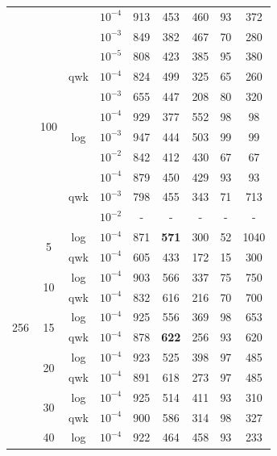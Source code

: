 \begin{table}[h!]
{{\begin{tabular}{c|c|c|c|c|c|c|c|c}
			& & & $10^{-4}$ & 913 & 453 & 460 & 93 & 372\\
			& & & $10^{-3}$ & 849 & 382 & 467 & 70 & 280\\\cline{3-9}
			& & \multirow{3}{*}{qwk} & $10^{-5}$ & 808 & 423 & 385 & 95 & 380\\
			& & & $10^{-4}$ & 824 & 499 & 325 & 65 & 260\\
			& & & $10^{-3}$ & 655 & 447 & 208 & 80 & 320\\\cline{2-9}
			& \multirow{2}{*}{100} & \multirow{3}{*}{log} & $10^{-4}$ & 929 & 377 & 552 & 98 & 98\\
			& & & $10^{-3}$ & 947 & 444 & 503 & 99 & 99\\
			& & & $10^{-2}$ & 842 & 412 & 430 & 67 & 67\\\cline{3-9}
			& & \multirow{3}{*}{qwk} & $10^{-4}$ & 879 & 450 & 429 & 93 & 93\\
			& & & $10^{-3}$ & 798 & 455 & 343 & 71 & 713\\
			& & & $10^{-2}$ & - & - & - & - & -\\
			\hline	
			\multirow{10}{*}{256} & \multirow{2}{*}{5} & \multirow{1}{*}{log} & $10^{-4}$ & 871 & \textbf{571} & 300 & 52 & 1040\\\cline{3-9}
			& & \multirow{1}{*}{qwk} & $10^{-4}$ & 605 & 433 & 172 & 15 & 300\\\cline{2-9}
			&\multirow{2}{*}{10} & \multirow{1}{*}{log} & $10^{-4}$ & 903 & 566  & 337 & 75 & 750\\\cline{3-9}
			& & \multirow{1}{*}{qwk} & $10^{-4}$ & 832 & 616 & 216 & 70 & 700\\\cline{2-9}		
			& \multirow{2}{*}{15} & \multirow{1}{*}{log} & $10^{-4}$ & 925 & 556 & 369 & 98 & 653\\\cline{3-9}
			& & \multirow{1}{*}{qwk} & $10^{-4}$ & 878 & \textbf{622} & 256 & 93 & 620\\\cline{2-9}
			& \multirow{2}{*}{20} & \multirow{1}{*}{log} & $10^{-4}$ & 923 & 525 & 398 & 97 & 485\\\cline{3-9}
			& & \multirow{1}{*}{qwk} & $10^{-4}$ & 891 & 618 & 273 & 97 & 485 \\\cline{2-9}		
			& \multirow{2}{*}{30} & \multirow{1}{*}{log} & $10^{-4}$ & 925 & 514 & 411 & 93 & 310\\\cline{3-9}
			& & \multirow{1}{*}{qwk} & $10^{-4}$ & 900 & 586 & 314 & 98 & 327\\\cline{2-9}
			& \multirow{2}{*}{40} & \multirow{1}{*}{log} & $10^{-4}$ & 922 & 464 & 458 & 93 & 233\\\cline{3-9}

\end{tabular}}}
\end{table}
